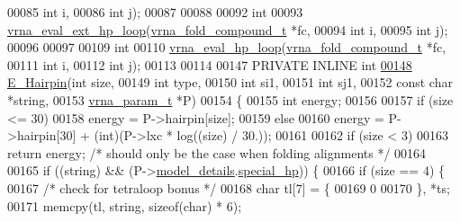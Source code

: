 \begin{DoxyCode}
00085                    \textcolor{keywordtype}{int}                  i,
00086                    \textcolor{keywordtype}{int}                  j);
00087 
00088 
00092 \textcolor{keywordtype}{int}
00093 \hyperlink{group__eval__loops__hp_gafd39e7355dcf36bf1517bafc1b49c2d2}{vrna\_eval\_ext\_hp\_loop}(\hyperlink{group__fold__compound_structvrna__fc__s}{vrna\_fold\_compound\_t}  *fc,
00094                       \textcolor{keywordtype}{int}                   i,
00095                       \textcolor{keywordtype}{int}                   j);
00096 
00097 
00109 \textcolor{keywordtype}{int}
00110 \hyperlink{group__eval__loops__hp_gad0bb844f8dc704c71737ae1d7e32b975}{vrna\_eval\_hp\_loop}(\hyperlink{group__fold__compound_structvrna__fc__s}{vrna\_fold\_compound\_t}  *fc,
00111                   \textcolor{keywordtype}{int}                   i,
00112                   \textcolor{keywordtype}{int}                   j);
00113 
00114 
00147 PRIVATE INLINE \textcolor{keywordtype}{int}
\hyperlink{group__eval__loops__hp_gadf943ee9a45b7f4cee9192c06210dace}{00148} \hyperlink{group__eval__loops__hp_gadf943ee9a45b7f4cee9192c06210dace}{E\_Hairpin}(\textcolor{keywordtype}{int}           size,
00149           \textcolor{keywordtype}{int}           type,
00150           \textcolor{keywordtype}{int}           si1,
00151           \textcolor{keywordtype}{int}           sj1,
00152           \textcolor{keyword}{const} \textcolor{keywordtype}{char}    *\textcolor{keywordtype}{string},
00153           \hyperlink{group__energy__parameters_structvrna__param__s}{vrna\_param\_t}  *P)
00154 \{
00155   \textcolor{keywordtype}{int} energy;
00156 
00157   \textcolor{keywordflow}{if} (size <= 30)
00158     energy = P->hairpin[size];
00159   \textcolor{keywordflow}{else}
00160     energy = P->hairpin[30] + (int)(P->lxc * log((size) / 30.));
00161 
00162   \textcolor{keywordflow}{if} (size < 3)
00163     \textcolor{keywordflow}{return} energy;            \textcolor{comment}{/* should only be the case when folding alignments */}
00164 
00165   \textcolor{keywordflow}{if} ((\textcolor{keywordtype}{string}) && (P->\hyperlink{group__energy__parameters_a7b84353eb9075c595bad4ceb871bcae7}{model\_details}.\hyperlink{group__model__details_add64a96d23e77ef1d0ddf8dfc5228143}{special\_hp})) \{
00166     \textcolor{keywordflow}{if} (size == 4) \{
00167       \textcolor{comment}{/* check for tetraloop bonus */}
00168       \textcolor{keywordtype}{char} tl[7] = \{
00169         0
00170       \}, *ts;
00171       memcpy(tl, \textcolor{keywordtype}{string}, \textcolor{keyword}{sizeof}(\textcolor{keywordtype}{char}) * 6);

\end{DoxyCode}
